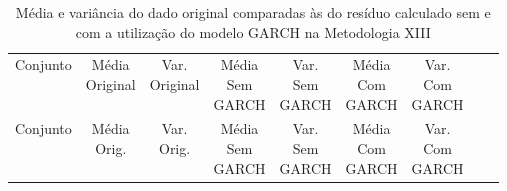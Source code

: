 \clearpage

\begin{center}
\begin{longtable}{ccccccccc}
\toprule
\rowcolor{white}
\caption[Metodologia XIII: dados estatísticos]{Média e variância do dado original
comparadas às do resíduo calculado sem e com a utilização do modelo GARCH na
Metodologia XIII} \label{tab:DadosEstatisticosMet13}\\
\midrule
    Conjunto & \specialcell{Média\\Original} &
    \specialcell{Var.\\Original} & \specialcell{Média\\Sem\\GARCH} &
    \specialcell{Var.\\Sem\\GARCH} & \specialcell{Média\\Com\\GARCH}&
    \specialcell{Var.\\Com\\GARCH} \\

\midrule
\endfirsthead 
\midrule
\rowcolor{white}
    Conjunto & \specialcell{Média\\Orig.} &
    \specialcell{Var.\\Orig.} & \specialcell{Média\\Sem\\GARCH} &
    \specialcell{Var.\\Sem\\GARCH} & \specialcell{Média\\Com\\GARCH}&
    \specialcell{Var.\\Com\\GARCH} \\


\end{longtable}
\end{center}
